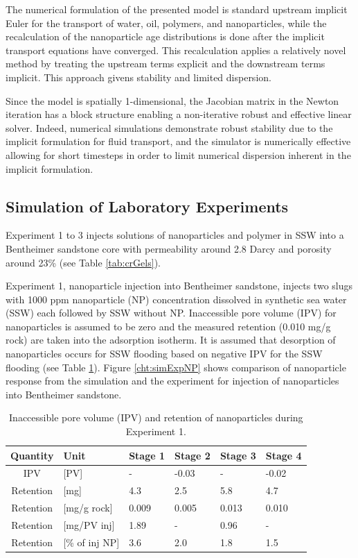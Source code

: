 \documentclass[journal = enfuem, manuscript =  article]{achemso}
\begin{document}
The numerical formulation of the presented model is standard upstream implicit Euler for the transport of water, oil, polymers, and nanoparticles, while the recalculation of the nanoparticle age distributions is done after the implicit transport equations have converged. This recalculation applies a relatively novel method \citep{Flatten2008} by treating the upstream terms explicit and the downstream terms implicit. This approach givens stability and limited dispersion. 

Since the model is spatially 1-dimensional, the Jacobian matrix in the Newton iteration has a block structure enabling a non-iterative robust and effective linear solver. Indeed, numerical simulations demonstrate robust stability due to the implicit formulation for fluid transport, and the simulator is numerically effective allowing for short timesteps in order to limit numerical dispersion inherent in the implicit formulation.



\subsection{Simulation of Laboratory Experiments}
Experiment 1 to 3 injects solutions of nanoparticles and polymer in SSW into a Bentheimer sandstone core with permeability around 2.8 Darcy and porosity around 23\% (see Table \ref{tab:crGels}).

Experiment 1, nanoparticle injection into Bentheimer sandstone, injects two slugs with 1000 ppm nanoparticle (NP) concentration dissolved in synthetic sea water (SSW) each followed by SSW without NP. Inaccessible pore volume (IPV) for nanoparticles is assumed to be zero and the measured retention (0.010 mg/g rock) are taken into the adsorption isotherm. It is assumed that desorption of nanoparticles occurs for SSW flooding based on negative IPV for the SSW flooding (see Table \ref{tab:ipvexp1}). Figure \ref{cht:simExpNP} shows comparison of nanoparticle response from the simulation and the experiment for injection of nanoparticles into Bentheimer sandstone.

\begin{table} %
\small
\centering
\caption{Inaccessible pore volume (IPV) and retention of nanoparticles during Experiment 1.}
\label{tab:ipvexp1}
\begin{tabular}{c l l l l l } 
\toprule
\textbf{Quantity} & \textbf{Unit} & \textbf{Stage 1} & \textbf{Stage 2} & \textbf{Stage 3} & \textbf{Stage 4} \\ 
\midrule 
IPV         & [PV]          & -         & -0.03     & -         & -0.02     \\
Retention   & [mg]          & 4.3       & 2.5       & 5.8       & 4.7       \\ 
Retention   & [mg/g rock]   & 0.009     & 0.005     & 0.013     & 0.010     \\ 
Retention   & [mg/PV inj]   & 1.89      & -         & 0.96      & -         \\
Retention   & [\% of inj NP]& 3.6       & 2.0       & 1.8       & 1.5       \\ 
\bottomrule
\end{tabular}
\end{table}
\end{document}
